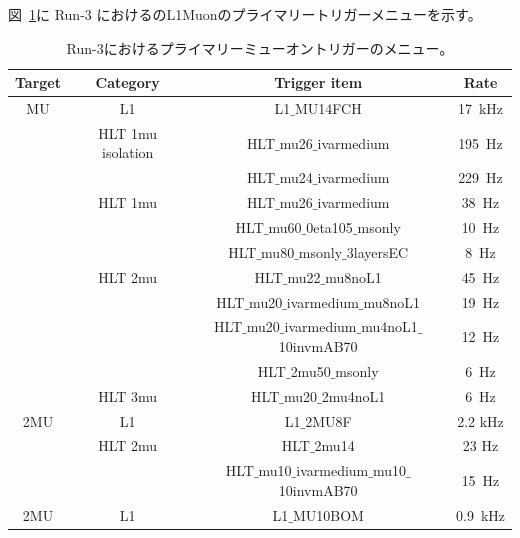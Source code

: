 図~\ref{triigermenu}に Run-3 におけるのL1Muonのプライマリートリガーメニューを示す。

\begin{table}[]
    \caption{Run-3におけるプライマリーミューオントリガーのメニュー\cite{article:Run3trigmenu}。}
    \label{triigermenu}
    \centering
    \begin{tabular}{|c|c|c|c|}
    \hline
        Target & Category & Trigger item & Rate\\
        \hline
        MU  & L1 & L1$\_$MU14FCH & 17~kHz\\
        \hline
            &HLT 1mu isolation & HLT$\_$mu26$\_$ivarmedium & 195~Hz\\
            &        & HLT$\_$mu24$\_$ivarmedium & 229~Hz\\
        \hline
            &HLT 1mu& HLT$\_$mu26$\_$ivarmedium & 38~Hz\\
            &       & HLT$\_$mu60$\_$0eta105$\_$msonly & 10~Hz\\
            &       & HLT$\_$mu80$\_$msonly$\_$3layersEC & 8~Hz\\
        \hline
            &HLT 2mu & HLT$\_$mu22$\_$mu8noL1 & 45~Hz\\
            &       & HLT$\_$mu20$\_$ivarmedium$\_$mu8noL1 & 19~Hz\\
            &       & HLT$\_$mu20$\_$ivarmedium$\_$mu4noL1$\_$10invmAB70 & 12~Hz\\
            &       & HLT$\_$2mu50$\_$msonly & 6~Hz\\
        \hline
            &HLT 3mu    & HLT$\_$mu20$\_$2mu4noL1 & 6~Hz\\
        \hline
        \hline
        2MU & L1        & L1$\_$2MU8F & 2.2 kHz\\
        \hline
            & HLT 2mu   & HLT$\_$2mu14 & 23 Hz\\
            &           & HLT$\_$mu10$\_$ivarmedium$\_$mu10$\_$10invmAB70 & 15~Hz\\
        \hline
        \hline
        2MU & L1 & L1$\_$MU10BOM & 0.9~kHz\\

\end{tabular}
\end{table}
